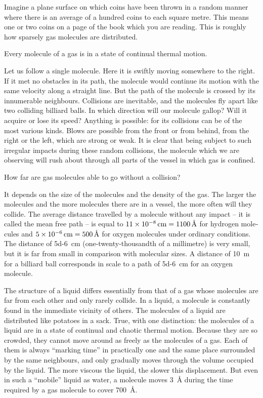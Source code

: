 Imagine a plane surface on which coins have been thrown in a random manner where there is an average of a hundred coins to each square metre. This means one or two coins on a page of the book which you are reading. This is roughly how sparsely gas molecules are distrib­uted.

Every molecule of a gas is in a state of continual thermal motion.

Let us follow a single molecule. Here it is swiftly moving somewhere to the right. If it met no obstacles in its path, the molecule would continue its motion with the same velocity along a straight line. But the path of the molecule is crossed by its innumerable neighbours. Collisions are inevitable, and the molecules fly apart like two colliding billiard balls. In which direction will our molecule gallop? Will it acquire or lose its speed? Anything is possible: for its collisions can be of the most various kinds. Blows are possible from the front or from behind, from the right or the left, which are strong or weak. It is clear that being subject to such irregular impacts during these random collisions, the molecule which we are observing will rush about through all parts of the vessel in which gas is confined.

How far are gas molecules able to go without a col­lision?

It depends on the size of the molecules and the density of the gas. The larger the molecules and the more mole­cules there are in a vessel, the more often will they collide. The average distance travelled by a molecule without any impact -- it is called the mean free path -- is equal to $\SI{11d-8}{\centi\meter} = \SI{1100}{\angstrom}$ for hydrogen mole­cules and $\SI{5d-6}{\centi\meter} = \SI{500}{\angstrom}$ for oxygen molecules under ordinary conditions. The distance of \SI{5d-6}{\centi\meter} (one-twenty-thousandth of a millimetre) is very small, but it is far from small in comparison with molecular sizes. A distance of \SI{10}{\meter} for a billiard ball corresponds in scale to a path of \SI{5d-6}{\centi\meter} for an oxygen molecule.

The structure of a liquid differs essentially from that of a gas whose molecules are far from each other and only rarely collide. In a liquid, a molecule is constantly found in the immediate vicinity of others. The molecules of a liquid are distributed like potatoes in a sack. True, with one distinction: the molecules of a liquid are in a state of continual and chaotic thermal motion. Because they are so crowded, they cannot move around as freely as the molecules of a gas. Each of them is always ``marking time'' in practically one and the same place surrounded by the same neighbours, and only gradually moves through the volume occupied by the liquid. The more viscous the liquid, the slower this displacement. But even in such a ``mobile'' liquid as water, a molecule moves \SI{3}{\angstrom} during the time required by a gas molecule to cover \SI{700}{\angstrom}.

